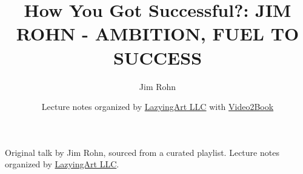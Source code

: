 \documentclass[11pt,oneside]{book}
\begin{document}
\frontmatter
\title{How You Got Successful?: JIM ROHN - AMBITION, FUEL TO SUCCESS}
\author{Jim Rohn}
\date{Lecture notes organized by \href{https://lazying.art}{LazyingArt LLC} with \href{https://github.com/lachlanchen/Video2Book}{Video2Book}}
\maketitle
\begin{center}
\small Original talk by Jim Rohn, sourced from a curated playlist. Lecture notes organized by \href{https://lazying.art}{LazyingArt LLC}.
\end{center}
\clearpage
\mainmatter

\end{document}

